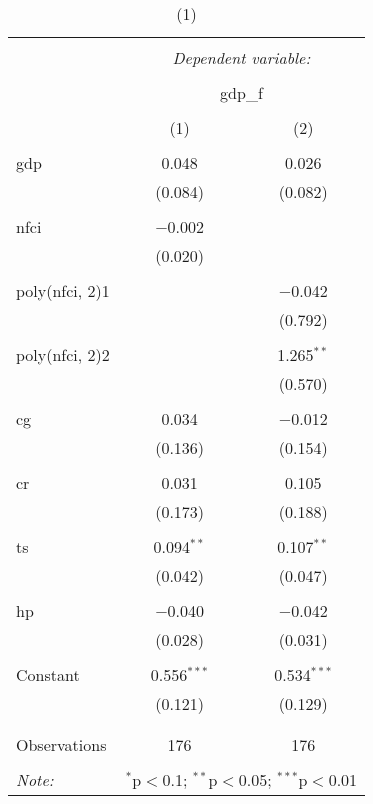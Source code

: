
\begin{table}[!htbp] \centering 
  \caption{(1)} 
  \label{} 
\begin{tabular}{@{\extracolsep{5pt}}lcc} 
\\[-1.8ex]\hline 
\hline \\[-1.8ex] 
 & \multicolumn{2}{c}{\textit{Dependent variable:}} \\ 
\cline{2-3} 
\\[-1.8ex] & \multicolumn{2}{c}{gdp\_f} \\ 
\\[-1.8ex] & (1) & (2)\\ 
\hline \\[-1.8ex] 
 gdp & 0.048 & 0.026 \\ 
  & (0.084) & (0.082) \\ 
  & & \\ 
 nfci & $-$0.002 &  \\ 
  & (0.020) &  \\ 
  & & \\ 
 poly(nfci, 2)1 &  & $-$0.042 \\ 
  &  & (0.792) \\ 
  & & \\ 
 poly(nfci, 2)2 &  & 1.265$^{**}$ \\ 
  &  & (0.570) \\ 
  & & \\ 
 cg & 0.034 & $-$0.012 \\ 
  & (0.136) & (0.154) \\ 
  & & \\ 
 cr & 0.031 & 0.105 \\ 
  & (0.173) & (0.188) \\ 
  & & \\ 
 ts & 0.094$^{**}$ & 0.107$^{**}$ \\ 
  & (0.042) & (0.047) \\ 
  & & \\ 
 hp & $-$0.040 & $-$0.042 \\ 
  & (0.028) & (0.031) \\ 
  & & \\ 
 Constant & 0.556$^{***}$ & 0.534$^{***}$ \\ 
  & (0.121) & (0.129) \\ 
  & & \\ 
\hline \\[-1.8ex] 
Observations & 176 & 176 \\ 
\hline 
\hline \\[-1.8ex] 
\textit{Note:}  & \multicolumn{2}{r}{$^{*}$p$<$0.1; $^{**}$p$<$0.05; $^{***}$p$<$0.01} \\ 
\end{tabular} 
\end{table} 
